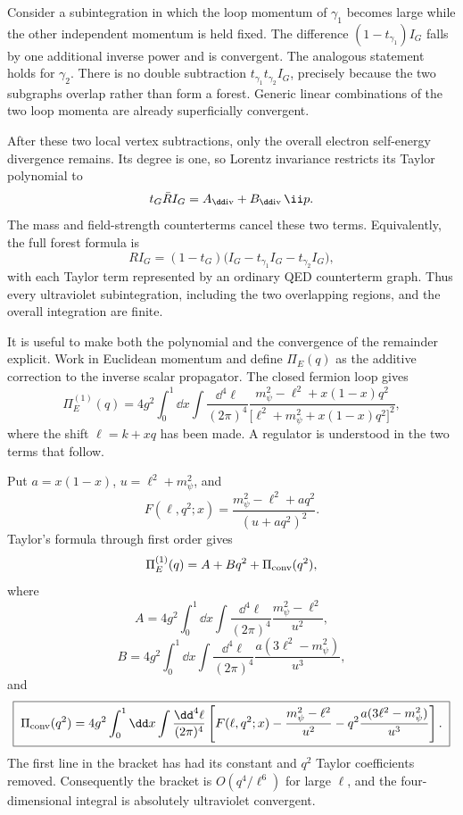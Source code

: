 \begin{enumerate}
Consider a subintegration in which the loop momentum of \(\gamma_1\) becomes
large while the other independent momentum is held fixed.  The difference
\((1-t_{\gamma_1})I_G\) falls by one additional inverse power and is
convergent.  The analogous statement holds for \(\gamma_2\).  There is no
double subtraction \(t_{\gamma_1}t_{\gamma_2}I_G\), precisely because the
two subgraphs overlap rather than form a forest.  Generic linear
combinations of the two loop momenta are already superficially convergent.

After these two local vertex subtractions, only the overall electron
self-energy divergence remains.  Its degree is one, so Lorentz invariance
restricts its Taylor polynomial to
\[
 t_G\bar R I_G=A_{\rm \dd iv}+B_{\rm \dd iv}\,\ii\sl p.
\]
The mass and field-strength counterterms cancel these two terms.  Equivalently,
the full forest formula is
\[
 \boxed{\quad
 R I_G=(1-t_G)
 \bigl(I_G-t_{\gamma_1}I_G-t_{\gamma_2}I_G\bigr),
 \quad}
\]
with each Taylor term represented by an ordinary QED counterterm graph.
Thus every ultraviolet subintegration, including the two overlapping
regions, and the overall integration are finite.

It is useful to make both the polynomial and the convergence of the
remainder explicit.  Work in Euclidean momentum and define
\(\Pi_E(q)\) as the additive correction to the inverse scalar propagator.
The closed fermion loop gives
\[
 \Pi_E^{(1)}(q)
 =4g^2\int_0^1\dd x\int\frac{\dd^4\ell}{(2\pi)^4}
 \frac{m_\psi^2-\ell^2+x(1-x)q^2}
 {\bigl[\ell^2+m_\psi^2+x(1-x)q^2\bigr]^2},
\]
where the shift \(\ell=k+xq\) has been made.  A regulator is understood in
the two terms that follow.

Put \(a=x(1-x)\), \(u=\ell^2+m_\psi^2\), and
\[
 F(\ell,q^2;x)=\frac{m_\psi^2-\ell^2+a q^2}{(u+a q^2)^2}.
\]
Taylor's formula through first order gives
\[
 \Pi_E^{(1)}(q)=A+Bq^2+\Pi_{\rm conv}(q^2),
\]
where
\[
 A=4g^2\int_0^1\dd x\int\frac{\dd^4\ell}{(2\pi)^4}
       \frac{m_\psi^2-\ell^2}{u^2},
\]
\[
 B=4g^2\int_0^1\dd x\int\frac{\dd^4\ell}{(2\pi)^4}
       \frac{a(3\ell^2-m_\psi^2)}{u^3},
\]
and
\[
 \boxed{\;
 \Pi_{\rm conv}(q^2)=4g^2\int_0^1\dd x\int\frac{\dd^4\ell}{(2\pi)^4}
 \left[
 F(\ell,q^2;x)-\frac{m_\psi^2-\ell^2}{u^2}
 -q^2\frac{a(3\ell^2-m_\psi^2)}{u^3}
 \right].\;}
\]
The first line in the bracket has had its constant and \(q^2\) Taylor
coefficients removed.  Consequently the bracket is
\(O(q^4/\ell^6)\) for large \(\ell\), and the four-dimensional integral is
absolutely ultraviolet convergent.


\end{enumerate}
